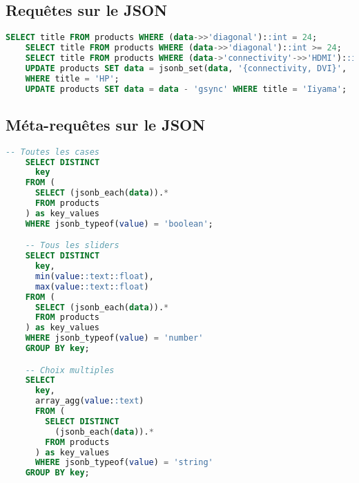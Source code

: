 \documentclass[a4paper,10pt]{article}
\begin{document}
  \subsection{Requêtes sur le JSON}
    \begin{lstlisting}[language=SQL, gobble=4, tabsize=2, showstringspaces=false]
    SELECT title FROM products WHERE (data->>'diagonal')::int = 24;
    SELECT title FROM products WHERE (data->>'diagonal')::int >= 24;
    SELECT title FROM products WHERE (data->'connectivity'->>'HDMI')::int >= 1;
    UPDATE products SET data = jsonb_set(data, '{connectivity, DVI}', '2')
    WHERE title = 'HP';
    UPDATE products SET data = data - 'gsync' WHERE title = 'Iiyama';
    \end{lstlisting}

  \subsection{Méta-requêtes sur le JSON}
    \begin{lstlisting}[language=SQL, gobble=4, tabsize=2, showstringspaces=false]
    -- Toutes les cases
    SELECT DISTINCT
      key
    FROM (
      SELECT (jsonb_each(data)).*
      FROM products
    ) as key_values
    WHERE jsonb_typeof(value) = 'boolean';

    -- Tous les sliders
    SELECT DISTINCT
      key,
      min(value::text::float),
      max(value::text::float)
    FROM (
      SELECT (jsonb_each(data)).*
      FROM products
    ) as key_values
    WHERE jsonb_typeof(value) = 'number'
    GROUP BY key;

    -- Choix multiples
    SELECT
      key,
      array_agg(value::text)
      FROM (
        SELECT DISTINCT
          (jsonb_each(data)).*
        FROM products
      ) as key_values
      WHERE jsonb_typeof(value) = 'string'
    GROUP BY key;
    \end{lstlisting}
\end{document}
